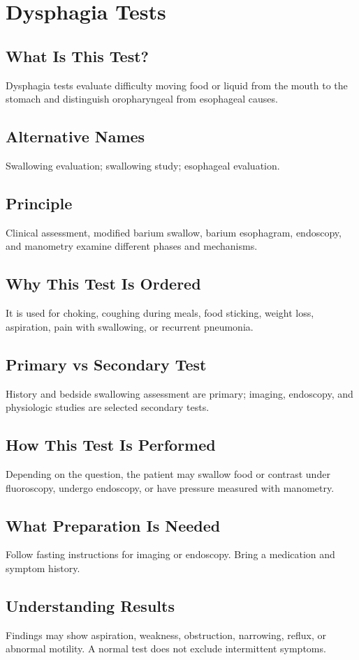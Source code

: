 \chapter{Dysphagia Tests}
\section*{What Is This Test?} Dysphagia tests evaluate difficulty moving food or liquid from the mouth to the stomach and distinguish oropharyngeal from esophageal causes.
\section*{Alternative Names} Swallowing evaluation; swallowing study; esophageal evaluation.
\section*{Principle} Clinical assessment, modified barium swallow, barium esophagram, endoscopy, and manometry examine different phases and mechanisms.
\section*{Why This Test Is Ordered} It is used for choking, coughing during meals, food sticking, weight loss, aspiration, pain with swallowing, or recurrent pneumonia.
\section*{Primary vs Secondary Test} History and bedside swallowing assessment are primary; imaging, endoscopy, and physiologic studies are selected secondary tests.
\section*{How This Test Is Performed} Depending on the question, the patient may swallow food or contrast under fluoroscopy, undergo endoscopy, or have pressure measured with manometry.
\section*{What Preparation Is Needed} Follow fasting instructions for imaging or endoscopy. Bring a medication and symptom history.
\section*{Understanding Results} Findings may show aspiration, weakness, obstruction, narrowing, reflux, or abnormal motility. A normal test does not exclude intermittent symptoms.
